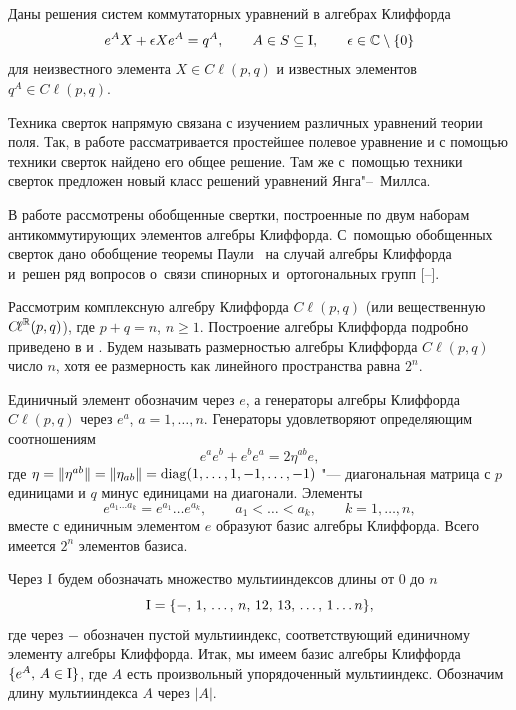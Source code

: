 Даны решения систем коммутаторных уравнений в алгебрах Клиффорда
$$
e^A X+\epsilon X e^A=q^A,\qquad A\in S\subseteq {\rm I},\qquad \epsilon\in{\Bbb C}\setminus\{0\}
$$
для неизвестного элемента $X\in{{C}\!\ell}(p,q)$ и известных элементов $q^A\in{{C}\!\ell}(p,q)$.



Техника сверток напрямую связана с изучением различных уравнений теории поля. 
Так, в работе \cite{shir:YM} рассматривается простейшее полевое уравнение и с помощью техники сверток найдено его общее решение. 
Там же с~помощью техники сверток предложен новый класс решений уравнений Янга"--~Миллса.

В работе \cite{shir:gencontr} рассмотрены обобщенные свертки, построенные по двум наборам антикоммутирующих элементов алгебры Клиффорда. 
С~помощью обобщенных сверток дано обобщение теоремы Паули~\cite{shir:Pauli} на случай алгебры Клиффорда~\cite{shir:gencontr} и~решен ряд вопросов о~связи спинорных и~ортогональных групп [--].

\smallskip

Рассмотрим комплексную алгебру Клиффорда ${{C}\!\ell}(p,q)$ (или вещественную ${{C}\!\ell}^{\Bbb R}(p,q)$), где $p+q=n$, $n\geq1$.
Построение алгебры Клиффорда подробно приведено в \cite{shir:Marchuk:Shirokov} и \cite{shir:Lounesto}. 
Будем называть размерностью алгебры Клиффорда ${{C}\!\ell}(p,q)$ число $n$, хотя ее размерность как линейного пространства равна $2^n$.

Единичный элемент обозначим через $e$, а генераторы алгебры Клиффорда ${{C}\!\ell}(p,q)$ через $e^a$, $a=1,\ldots,n$. Генераторы удовлетворяют определяющим соотношениям
$$
e^a e^b+e^b e^a=2\eta^{ab}e,
$$
где $\eta=\|\eta^{ab}\|=\|\eta_{ab}\|=\mathop{\rm diag}(1, \ldots, 1, -1, \ldots, -1)$ "--- диагональная матрица с $p$ единицами и $q$ минус единицами на диагонали. 
Элементы
$$
e^{a_1\ldots a_k}=e^{a_1}\ldots e^{a_k},\qquad a_1<\ldots<a_k,\qquad k=1,\ldots,n,
$$
вместе с единичным элементом $e$ образуют базис алгебры Клиффорда. Всего имеется $2^n$ элементов базиса.

Через $\rm I$ будем обозначать множество мультииндексов длины от $0$ до $n$
\begin{equation}
{\rm I}=\{-,\, 1,\, \ldots,\, n,\, 12,\, 13,\, \ldots,\, 1\ldots n\},\label{shirokov:Inab}
\end{equation}
где через $-$ обозначен пустой мультииндекс, соответствующий единичному элементу алгебры Клиффорда. 
Итак, мы имеем базис алгебры Клиффорда $\{e^A,\, A\in{\rm I} \}$, где $A$ есть произвольный упорядоченный мультииндекс. Обозначим длину мультииндекса $A$ через $|A|$.

